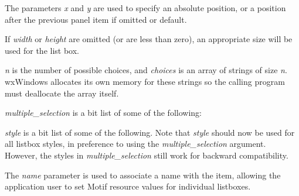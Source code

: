 The parameters {\it x} and {\it y} are used to specify an absolute
position, or a position after the previous panel item if omitted or
default.

If {\it width} or {\it height} are omitted (or are less than zero), an
appropriate size will be used for the list box.

{\it n} is the number of possible choices, and {\it choices} is an array of strings
of size {\it n}. wxWindows allocates its own memory for these strings so the
calling program must deallocate the array itself.

{\it multiple\_selection} is a bit list of some of the following:

\begin{twocollist}\itemsep=0pt
\end{twocollist}

{\it style} is a bit list of some of the following. Note that {\it style} should now
be used for all listbox styles, in preference to using the {\it multiple\_selection} argument.
However, the styles in {\it multiple\_selection} still work for backward compatibility.

\begin{twocollist}\itemsep=0pt
\end{twocollist}

The {\it name} parameter is used to associate a name with the item,
allowing the application user to set Motif resource values for
individual listboxes.


